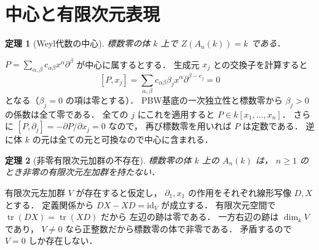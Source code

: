 \documentclass[a5paper,10pt,onecolumn]{jsarticle}
\makeatletter
\theoremstyle{mathnotetheorem}
\newtheorem{theorem}{定理}[section]
\renewcommand{\proofname}{証明}
\renewenvironment{proof}[1][\proofname]{%
  \par\pushQED{\qed}\normalfont\topsep4\p@\@plus2\p@\relax
  \trivlist\item[\hskip\labelsep\bfseries #1]\ignorespaces
}{\popQED\endtrivlist\@endpefalse}
\makeatother
\begin{document}
\section{中心と有限次元表現}
\begin{theorem}[Weyl代数の中心]\label{thm:center}
標数零の体 $k$ 上で
$Z(A_n(k))=k$ である．
\end{theorem}
\begin{proof}
$P=\sum_{\alpha,\beta}
c_{\alpha\beta}x^\alpha\partial^\beta$ が中心に属するとする．
生成元 $x_j$ との交換子を計算すると
\[
 [P,x_j]=
 \sum_{\alpha,\beta}
 c_{\alpha\beta}\beta_j
 x^\alpha\partial^{\beta-e_j}=0
\]
となる（$\beta_j=0$ の項は零とする）．
PBW基底の一次独立性と標数零から
$\beta_j>0$ の係数は全て零である．
全ての $j$ にこれを適用すると $P\in k[x_1,\ldots,x_n]$．
さらに
$[P,\partial_j]=-\partial P/\partial x_j=0$ なので，
再び標数零を用いれば $P$ は定数である．
逆に体 $k$ の元は全ての元と可換なので中心に含まれる．
\end{proof}
\begin{theorem}[非零有限次元加群の不存在]
標数零の体 $k$ 上の $A_n(k)$ は，
$n\ge1$ のとき非零の有限次元左加群を持たない．
\end{theorem}
\begin{proof}
有限次元左加群 $V$ が存在すると仮定し，
$\partial_1,x_1$ の作用をそれぞれ線形写像 $D,X$ とする．
定義関係から
$DX-XD=\mathrm{id}_V$ が成立する．
有限次元空間で
$\operatorname{tr}(DX)=\operatorname{tr}(XD)$ だから
左辺の跡は零である．
一方右辺の跡は $\dim_kV$ であり，
$V\ne0$ なら正整数だから標数零の体で非零である．
矛盾するので $V=0$ しか存在しない．
\end{proof}
\end{document}
